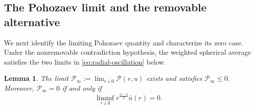 \documentclass[11pt]{article}
\numberwithin{equation}{section}
\newtheorem{lemma}[theorem]{Lemma}
\theoremstyle{remark}
\newcommand{\cP}{\mathcal P}
\begin{document}
\par
\subsection{The Pohozaev limit and the removable alternative}

{
We next identify the limiting Pohozaev quantity and characterize its zero
case. Under the nonremovable contradiction hypothesis, the weighted
spherical average satisfies the two limits in
\eqref{eq:radial-oscillation} below.
}

\begin{lemma}\label{lem:pohozaev-limit}
{
The limit
\(\cP_\infty:=\lim_{r\downarrow0}\cP(r,u)\) exists and satisfies
\(\cP_\infty\le0\). Moreover, \(\cP_\infty=0\) if and only if
\[
 \liminf_{r\downarrow0}r^{\frac{n-2}{2}}\bar u(r)=0.
\]
}
\end{lemma}
\end{document}
